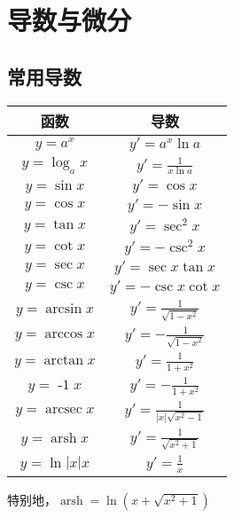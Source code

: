 \documentclass[12pt , a4paper , oneside]{ctexart}
\begin{document}
    \section{导数与微分}
        \subsection{常用导数}
        \begin{center}
            \begin{tabular}{c|c}
                \toprule
                \textbf{函数} & \textbf{导数} \\  %
                \midrule
                $y = a^x$ & $y' = a^x \ln a$ \\  %
                \midrule
                $y = \log_a x$ & $y' = \frac{1}{x \ln a}$ \\  %
                \midrule
                $y = \sin x$ & $y' = \cos x$ \\  %
                \midrule
                $y = \cos x$ & $y' = -\sin x$ \\  %
                \midrule
                $y = \tan x$ & $y' = \sec^2 x$ \\  %
                \midrule
                $y = \cot x$ & $y' = -\csc^2 x$ \\  %
                \midrule
                $y = \sec x$ & $y' = \sec x \tan x$ \\  %
                \midrule
                $y = \csc x$ & $y' = -\csc x \cot x$ \\  %
                \midrule
                $y = \arcsin x$ & $y' = \frac{1}{\sqrt{1-x^2}}$ \\  %
                \midrule
                $y = \arccos x$ & $y' = -\frac{1}{\sqrt{1-x^2}}$ \\  %
                \midrule
                $y = \arctan x$ & $y' = \frac{1}{1+x^2}$ \\  %
                \midrule
                $y = \operatorname{-1} x$ & $y' = -\frac{1}{1+x^2}$ \\  %
                \midrule
                $y = \operatorname{arcsec} x$ & $y' = \frac{1}{|x|\sqrt{x^2-1}}$ \\  %
                \midrule
                $y = \operatorname{arsh} x$ & $y' = \frac{1}{\sqrt{x^2+1}}$ \\  %
                \midrule
                $y = \ln{|x|} x$ & $y' = \frac{1}{x}$ \\  %
                \bottomrule
            \end{tabular}
            \end{center}
            特别地，$\operatorname{arsh} = \ln{(x+\sqrt{x^2+1})}$
\end{document}
